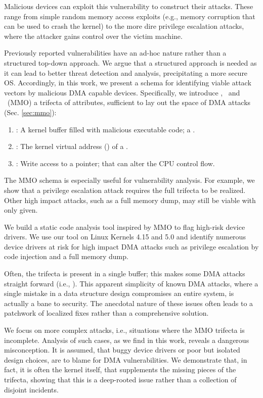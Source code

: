 Malicious devices can exploit this vulnerability to construct their attacks. These range from simple random memory access exploits (e.g., memory corruption that can be used to crash the kernel) to the more dire privilege escalation attacks, where the attacker gains control over the victim machine.

Previously reported vulnerabilities have an ad-hoc nature \cite{thunder,MMT16,Ben17b} rather than a structured top-down approach. We argue that a structured approach is needed as it can lead to better threat detection and analysis, precipitating a more secure OS. Accordingly, in this work, we present a schema for identifying viable attack vectors by malicious DMA capable devices. Specifically, we introduce \means,~\motivation{} and \oportunity~(MMO) a trifecta of attributes, sufficient to lay out the space of DMA attacks (Sec. \ref{sec:mmo}):
\begin{enumerate}
    \item \motivation: A kernel buffer filled with malicious executable code; a \mabaf.
    \item \means: The kernel virtual address (\kva) of a \mabaf.
    \item \oportunity: Write access to a pointer; that can alter the CPU control flow.
\end{enumerate} 

The MMO schema is especially useful for vulnerability analysis. For example, we show that a privilege escalation attack requires the full trifecta to be realized. Other high impact attacks, such as a full memory dump, may still be viable with only \oportunity{} given. 

We build a static code analysis tool inspired by MMO to flag high-risk device drivers. We use our tool on Linux Kernels 4.15 and 5.0 and identify numerous device drivers at risk for high impact DMA attacks such as privilege escalation by code injection and a full memory dump. 

Often, the trifecta is present in a single buffer; this makes some DMA attacks straight forward (i.e., \simple{}). This apparent simplicity of known DMA attacks, where a single mistake in a data structure design compromises an entire system, is actually a bane to security. The anecdotal nature of these issues often leads to a patchwork of localized fixes rather than a comprehensive solution. 

We focus on more complex attacks, i.e., situations where the MMO trifecta is incomplete. Analysis of such cases, as we find in this work, reveals a dangerous misconception. It is assumed, that buggy device drivers or poor but isolated design choices, are to blame for DMA vulnerabilities. We demonstrate that, in fact, it is often the kernel itself, that supplements the missing pieces of the trifecta, showing that this is a deep-rooted issue rather than a collection of disjoint incidents.

